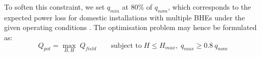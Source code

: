 \begin{comment}
as \cite{sia_sondes_2010}:

\begin{equation}
\label{eq:q_nom}
    q_{nom} \approx \frac{T_g - T_{mf, min}}{11.5} \ \left( 10.6 \lambda + 11.2 + 2 \left( \frac{\lambda}{\alpha} - 2 \right) \right)
\end{equation}
\end{comment}

To soften this constraint, we set $q_{min}$ at 80\% of $q_{nom}$, which corresponds to the expected power loss for domestic installations with multiple BHEs under the given operating conditions \cite{sia_sondes_2010}.
The optimisation problem may hence be formulated as: 
%
\begin{equation}
\label{eq:optimisation}
    Q_{pot} = \max_{B, H} \; Q_{field} \quad \quad \text{subject to} \; H \leq H_{max}, \; q_{max} \geq 0.8 \ q_{nom}
\end{equation}

